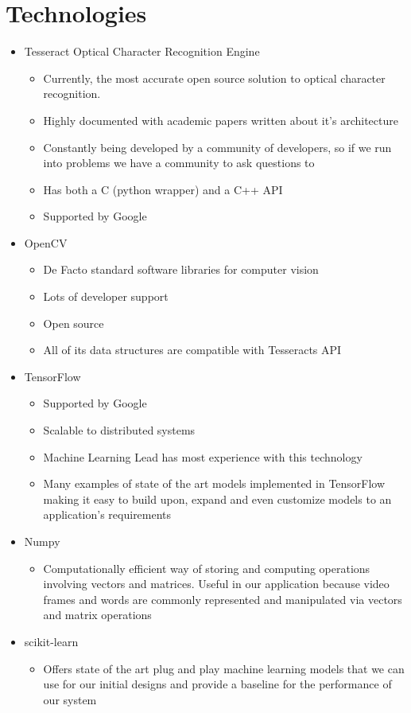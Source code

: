 	\section{Technologies}
		\begin{itemize}
			\item Tesseract Optical Character Recognition Engine
			\begin{itemize}
				\item Currently, the most accurate open source solution to optical character recognition.
				\item Highly documented with academic papers written about it’s architecture
				\item Constantly being developed by a community of developers, so if we run into problems we have a community to ask questions to
				\item Has both a C (python wrapper) and a C++ API
				\item Supported by Google
			\end{itemize}

			\item OpenCV
			\begin{itemize}
				\item De Facto standard software libraries for computer vision
				\item Lots of developer support
				\item Open source
				\item All of its data structures are compatible with Tesseracts API
			\end{itemize}

			\item TensorFlow
			\begin{itemize}
				\item Supported by Google
				\item Scalable to distributed systems
				\item Machine Learning Lead has most experience with this technology
				\item Many examples of state of the art models implemented in TensorFlow making it easy to build upon, expand and even customize models to an application’s requirements
			\end{itemize}

			\item Numpy
			\begin{itemize}
				\item Computationally efficient way of storing and computing operations involving vectors and matrices. Useful in our application because video frames and words are commonly represented and manipulated via vectors and matrix operations
			\end{itemize}
\pagebreak
			\item scikit-learn
			\begin{itemize}
				\item Offers state of the art plug and play machine learning models that we can use for our initial designs and provide a baseline for the performance of our system 
			\end{itemize}
		\end{itemize}